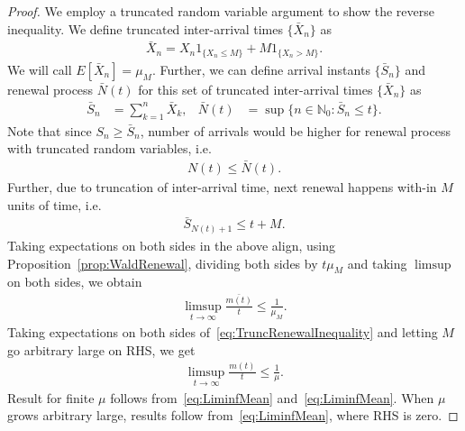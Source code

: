 \documentclass[a4paper,10pt, english]{article}
\begin{document}
\begin{proof}
We employ a truncated random variable argument to show the reverse inequality. We define truncated inter-arrival times $\{\bar{X}_n\}$ as 
\begin{align*}
\bar{X}_n = X_n 1_{\{X_n \leq M\}} + M1_{\{X_n > M\}}.
\end{align*}
We will call $E[\bar{X}_n] = \mu_M$. Further, we can define arrival instants $\{\bar{S}_n\}$ and renewal process $\bar{N}(t)$ for this set of truncated inter-arrival times $\{\bar{X}_n\}$ as 
\begin{align*}
 \bar{S}_n &= \sum_{k=1}^n \bar{X}_k, & \bar{N}(t) &= \sup\{n \in \mathbb{N}_0: \bar{S}_n \leq t\}.
\end{align*}
Note that since $S_n \geq \bar{S}_n$, number of arrivals would be higher for renewal process with truncated random variables, i.e. 
\begin{align}
\label{eq:TruncRenewalInequality}
  N(t) \leq \bar{N}(t).
\end{align}
Further, due to truncation of inter-arrival time, next renewal happens with-in $M$ units of time, i.e.
\begin{align*}
  \bar{S}_{N(t)+1} \leq t+M.
\end{align*}
Taking expectations on both sides in the above align, using Proposition~\ref{prop:WaldRenewal}, dividing both sides by $t \mu_M$ and taking $\limsup$ on both sides, we obtain
\begin{align*}
\limsup_{t \to \infty}\frac{\bar{m(t)}}{t} \leq \frac{1}{\mu_M}.
\end{align*}
Taking expectations on both sides of~\eqref{eq:TruncRenewalInequality} and letting $M$ go arbitrary large on RHS, we get
\begin{align}
\label{eq:LimsupMean}
\limsup_{t \to \infty}\frac{m(t)}{t} \leq \frac{1}{\mu}.
\end{align}
Result for finite $\mu$ follows from~\eqref{eq:LiminfMean} and~\eqref{eq:LiminfMean}. When $\mu$ grows arbitrary large, results follow from~\eqref{eq:LiminfMean}, where RHS is zero. 
\end{proof}
\end{document}
